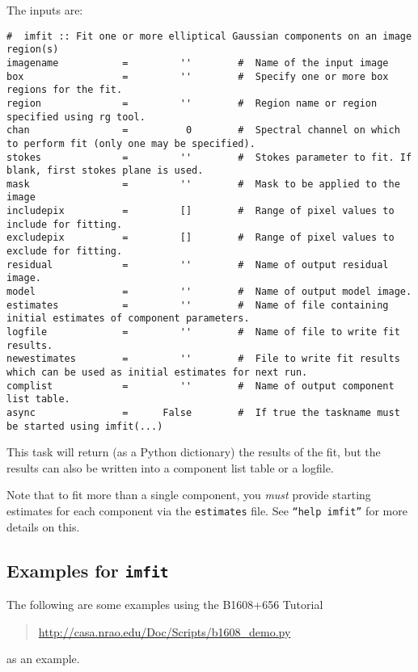 The inputs are:
\small
\begin{verbatim}
#  imfit :: Fit one or more elliptical Gaussian components on an image region(s)
imagename           =         ''        #  Name of the input image
box                 =         ''        #  Specify one or more box regions for the fit.
region              =         ''        #  Region name or region specified using rg tool.
chan                =          0        #  Spectral channel on which to perform fit (only one may be specified).
stokes              =         ''        #  Stokes parameter to fit. If blank, first stokes plane is used.
mask                =         ''        #  Mask to be applied to the image
includepix          =         []        #  Range of pixel values to include for fitting.
excludepix          =         []        #  Range of pixel values to exclude for fitting.
residual            =         ''        #  Name of output residual image.
model               =         ''        #  Name of output model image.
estimates           =         ''        #  Name of file containing initial estimates of component parameters.
logfile             =         ''        #  Name of file to write fit results.
newestimates        =         ''        #  File to write fit results which can be used as initial estimates for next run.
complist            =         ''        #  Name of output component list table.
async               =      False        #  If true the taskname must be started using imfit(...)

\end{verbatim}
\normalsize
This task will return (as a Python dictionary) the results of the fit,
but the results can also be written into a component list table or a
logfile. 
 
Note that to fit more than a single component, you {\em must} provide
starting estimates for each component via the {\tt estimates} file.
See {\tt ``help imfit''} for more details on this.

\subsection{Examples for {\tt imfit}}
\label{section:analysis.imfit.examples}

The following are some examples using the B1608+656 Tutorial
\begin{quote}
  \url{http://casa.nrao.edu/Doc/Scripts/b1608_demo.py}
\end{quote}
as an example.


